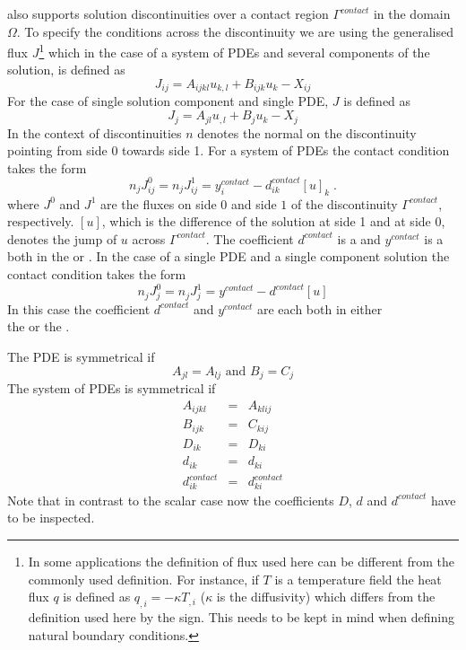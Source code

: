 \LinearPDE also supports solution discontinuities over a
contact region $\Gamma^{contact}$ in the domain $\Omega$.
To specify the conditions across the discontinuity we are using the
generalised flux $J$\footnote{In some applications the definition of flux used
here can be different from the commonly used definition.
For instance, if $T$ is a temperature field the heat flux $q$ is defined as
$q_{,i}=-\kappa T_{,i}$ ($\kappa$ is the diffusivity) which differs from the
definition used here by the sign. This needs to be kept in mind when defining
natural boundary conditions.} which in
the case of a system of PDEs and several components of the solution, is
defined as
\begin{equation}\label{LINEARPDE.SYSTEM.5}
J_{ij}=A_{ijkl}u_{k,l}+B_{ijk}u_{k}-X_{ij}
\end{equation}
For the case of single solution component and single PDE, $J$ is defined as
\begin{equation}\label{LINEARPDE.SINGLE.5}
J_{j}=A_{jl}u_{,l}+B_{j}u_{k}-X_{j}
\end{equation}
In the context of discontinuities $n$ denotes the normal
on the discontinuity pointing from side 0 towards side 1.
For a system of PDEs the contact condition takes the form
\begin{equation}\label{LINEARPDE.SYSTEM.6}
n_{j} J^{0}_{ij}=n_{j} J^{1}_{ij}=y^{contact}_{i} - d^{contact}_{ik} [u]_{k} \; .
\end{equation}
where $J^{0}$ and $J^{1}$ are the fluxes on side $0$ and side $1$ of the
discontinuity $\Gamma^{contact}$, respectively. $[u]$, which is the difference
of the solution at side 1 and at side 0, denotes the jump of $u$ across $\Gamma^{contact}$.
The coefficient $d^{contact}$ is a \RankTwo and $y^{contact}$ is a
\RankOne both in the \FunctionOnContactZero or \FunctionOnContactOne.
In the case of a single PDE and a single component solution the contact
condition takes the form
\begin{equation}\label{LINEARPDE.SINGLE.6}
n_{j} J^{0}_{j}=n_{j} J^{1}_{j}=y^{contact} - d^{contact}[u]
\end{equation}
In this case the coefficient $d^{contact}$ and $y^{contact}$ are each
\Scalars both in either\\
the \FunctionOnContactZero or the \FunctionOnContactOne.

The PDE is symmetrical if
\begin{equation}\label{LINEARPDE.SINGLE.4}
A_{jl}=A_{lj} \mbox{ and } B_{j}=C_{j}
\end{equation}
The system of PDEs is symmetrical if
\begin{eqnarray}
\label{LINEARPDE.SYSTEM.4}
A_{ijkl}&=&A_{klij} \\
B_{ijk}&=&C_{kij} \\
D_{ik}&=&D_{ki} \\
d_{ik}&=&d_{ki} \\
d^{contact}_{ik}&=&d^{contact}_{ki}
\end{eqnarray}
Note that in contrast to the scalar case  now the
coefficients $D$, $d$ and $d^{contact}$ have to be inspected.

